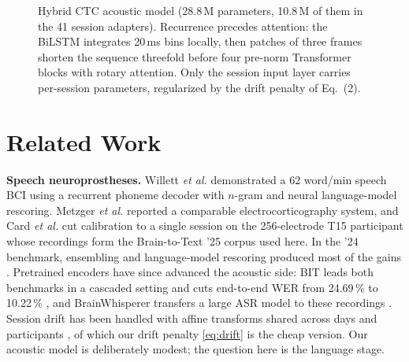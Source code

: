 \documentclass[conference,a4paper,10pt]{IEEEtran}
\newcommand{\pct}{\,\%}
\begin{document}
\begin{figure}[!t]
{}
\caption{Hybrid CTC acoustic model (28.8\,M parameters, 10.8\,M of them in the 41 session adapters). Recurrence precedes attention: the BiLSTM integrates 20\,ms bins locally, then patches of three frames shorten the sequence threefold before four pre-norm Transformer blocks with rotary attention. Only the session input layer carries per-session parameters, regularized by the drift penalty of Eq.~(2).}
\label{fig:arch}
\end{figure}

\section{Related Work}\label{sec:related}
\textbf{Speech neuroprostheses.} Willett \textit{et al.} \cite{willett2023speech}
demonstrated a 62 word/min speech BCI using a recurrent phoneme decoder with
$n$-gram and neural language-model rescoring. Metzger \textit{et al.}
\cite{metzger2023avatar} reported a comparable electrocorticography system, and
Card \textit{et al.} \cite{card2024accurate} cut calibration to a single session
on the 256-electrode T15 participant whose recordings form the Brain-to-Text '25
corpus \cite{kaggle2025b2t} used here. In the '24 benchmark, ensembling and
language-model rescoring produced most of the gains \cite{willett2024benchmark}.
Pretrained encoders have since advanced the acoustic side: BIT leads both
benchmarks in a cascaded setting and cuts end-to-end WER from 24.69\pct{} to
10.22\pct{} \cite{zhang2026bit}, and BrainWhisperer transfers a large ASR
model to these recordings \cite{boccato2026brainwhisperer}.
Session drift has been handled with affine transforms shared across days and
participants \cite{boccato2026crosssubject}, of which our drift penalty
\eqref{eq:drift} is the cheap version. Our acoustic model is deliberately
modest; the question here is the language stage.
\end{document}
